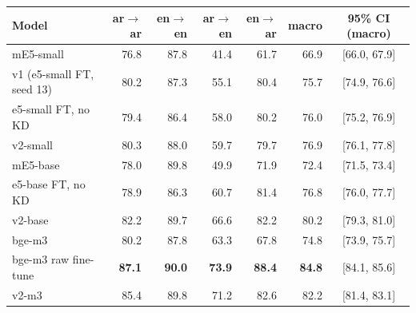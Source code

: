 \begin{tabular}{@{}lrrrrrc@{}}
\toprule
Model & ar$\to$ar & en$\to$en & ar$\to$en & en$\to$ar & macro & 95\% CI (macro) \\
\midrule
mE5-small & 76.8 & 87.8 & 41.4 & 61.7 & 66.9 & [66.0, 67.9] \\
v1 (e5-small FT, seed 13) & 80.2 & 87.3 & 55.1 & 80.4 & 75.7 & [74.9, 76.6] \\
e5-small FT, no KD & 79.4 & 86.4 & 58.0 & 80.2 & 76.0 & [75.2, 76.9] \\
v2-small & 80.3 & 88.0 & 59.7 & 79.7 & 76.9 & [76.1, 77.8] \\
\midrule
mE5-base & 78.0 & 89.8 & 49.9 & 71.9 & 72.4 & [71.5, 73.4] \\
e5-base FT, no KD & 78.9 & 86.3 & 60.7 & 81.4 & 76.8 & [76.0, 77.7] \\
v2-base & 82.2 & 89.7 & 66.6 & 82.2 & 80.2 & [79.3, 81.0] \\
\midrule
bge-m3 & 80.2 & 87.8 & 63.3 & 67.8 & 74.8 & [73.9, 75.7] \\
bge-m3 raw fine-tune & \textbf{87.1} & \textbf{90.0} & \textbf{73.9} & \textbf{88.4} & \textbf{84.8} & [84.1, 85.6] \\
v2-m3 & 85.4 & 89.8 & 71.2 & 82.6 & 82.2 & [81.4, 83.1] \\
\bottomrule
\end{tabular}
